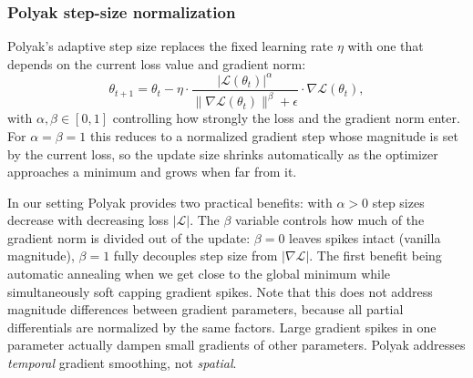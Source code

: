 \subsubsection{Polyak step-size normalization}\label{sec:method:opt:stabilization:polyak}
Polyak's adaptive step size \cite{Polyak1964} replaces the fixed learning rate $\eta$ with one that depends on the current loss value and gradient norm:
\begin{equation}
    \theta_{t+1} = \theta_t - \eta \cdot \frac{|\mathcal{L}(\theta_t)|^{\alpha}}{\|\nabla \mathcal{L}(\theta_t)\|^{\beta} + \epsilon} \cdot \nabla \mathcal{L}(\theta_t),
\end{equation}
with $\alpha, \beta \in [0,1]$ controlling how strongly the loss and the gradient norm enter.
For $\alpha = \beta = 1$ this reduces to a normalized gradient step whose magnitude is set by the current loss,
so the update size shrinks automatically as the optimizer approaches a minimum and grows when far from it.

In our setting Polyak provides two practical benefits: with $\alpha > 0$ step sizes decrease with decreasing loss $|\mathcal{L}|$.
The $\beta$ variable controls how much of the gradient norm is divided out of the update:
$\beta=0$ leaves spikes intact (vanilla magnitude), $\beta=1$ fully decouples step size from $|\nabla\mathcal{L}|$.
The first benefit being automatic annealing when we get close to the global minimum while simultaneously soft capping gradient spikes.
Note that this does not address magnitude differences between gradient parameters, because all partial differentials are normalized by the same factors.
Large gradient spikes in one parameter actually dampen small gradients of other parameters.
Polyak addresses \emph{temporal} gradient smoothing, not \emph{spatial}.

